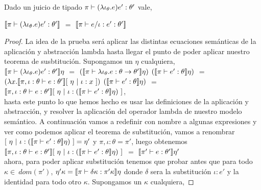 \begin{theorem}
Dado un juicio de tipado $\pi \vdash (\lambda \iota_{\theta} . e)e' : \theta'$ vale,

\begin{center}
$\llbracket \pi \vdash (\lambda \iota_{\theta} . e)e' : \theta' \rrbracket$ $=$
$\llbracket \pi \vdash e / \iota:e' : \theta' \rrbracket$
\end{center}

\end{theorem}
\begin{proof}

La idea de la prueba ser\'a aplicar las distintas ecuaciones sem\'anticas de la aplicaci\'on
y abstracci\'on lambda hasta llegar el punto de poder aplicar nuestro teorema de susbtituci\'on.
Supongamos un $\eta$ cualquiera,\\

$\llbracket \pi \vdash (\lambda \iota_{\theta} . e)e' : \theta' \rrbracket\eta$ $=$
$(\llbracket \pi \vdash \lambda \iota_{\theta} . e : \theta \rightarrow \theta' \rrbracket\eta)$
$(\llbracket \pi \vdash e' : \theta \rrbracket\eta)$ $=$\\

$(\lambda x . \llbracket \pi,\iota:\theta \vdash e : \theta' \rrbracket[ \ \eta \ | \ \iota:x \ ])$
$(\llbracket \pi \vdash e' : \theta \rrbracket\eta)$ $=$\\

$\semBrcks{\pi,\iota:\theta \vdash e : \theta'}[ \ \eta \ | \ 
	\iota:(\semBrcks{\pi \vdash e' : \theta}\eta) \ ]$,\\
												
hasta este punto lo que hemos hecho es usar las definiciones de la aplicaci\'on
y abstracci\'on, y resolver la aplicaci\'on del operador lambda de nuestro
modelo sem\'antico. A continuaci\'on vamos a redefinir con nombre a algunas 
expresiones y ver como podemos aplicar el teorema de substituci\'on, vamos
a renombrar $[ \ \eta \ | \ \iota:(\llbracket \pi \vdash e' : \theta \rrbracket\eta) \ ] = \eta'$
y $\pi,\iota:\theta = \pi'$, luego obtenemos\\

$\semBrcks{\pi,\iota:\theta \vdash e : \theta'}[ \ \eta \ | \ 
	\iota:(\semBrcks{\pi \vdash e' : \theta}\eta) \ ]$ $=$ $\llbracket \pi' \vdash e : \theta' \rrbracket\eta'$\\

ahora, para poder aplicar substituci\'on tenemos que probar antes que
para todo $\kappa \in \ dom (\pi')$, $\eta' \kappa = \llbracket \pi \vdash \delta\kappa : \pi' \kappa \rrbracket\eta$
donde $\delta$ sera la substituci\'on $\iota:e'$ y la identidad para todo otro $\kappa$. Supongamos
un $\kappa$ cualquiera,


\end{proof}
